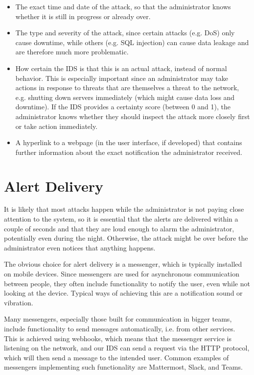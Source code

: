 \documentclass[oneside, english]{reports/assets/sdqtechreport}
\begin{document}
\begin{itemize}
	\item The exact time and date of the attack, so that the administrator knows whether
	      it is still in progress or already over.
	\item The type and severity of the attack, since certain attacks (e.g. DoS) only
	      cause downtime, while others (e.g. SQL injection) can cause data leakage and
	      are therefore much more problematic.
	\item How certain the IDS is that this is an actual attack, instead of normal
	      behavior. This is especially important since an administrator may take actions
	      in response to threats that are themselves a threat to the network, e.g.
	      shutting down servers immediately (which might cause data loss and downtime).
	      If the IDS provides a certainty score (between 0 and 1), the administrator
	      knows whether they should inspect the attack more closely first or take action
	      immediately.
	\item A hyperlink to a webpage (in the user interface, if developed) that contains
	      further information about the exact notification the administrator received.
\end{itemize}

\section{Alert Delivery}
\label{sec:AlertDelivery}

It is likely that most attacks happen while the administrator is not paying
close attention to the system, so it is essential that the alerts are delivered
within a couple of seconds and that they are loud enough to alarm the
administrator, potentially even during the night. Otherwise, the attack might
be over before the administrator even notices that anything happens.

The obvious choice for alert delivery is a messenger, which is typically
installed on mobile devices. Since messengers are used for asynchronous
communication between people, they often include functionality to notify the
user, even while not looking at the device. Typical ways of achieving this are
a notification sound or vibration.

Many messengers, especially those built for communication in bigger teams,
include functionality to send messages automatically, i.e. from other services.
This is achieved using webhooks, which means that the messenger service is
listening on the network, and our IDS can send a request via the HTTP protocol,
which will then send a message to the intended user. Common examples of
messengers implementing such functionality are Mattermost, Slack, and Teams.
\end{document}
